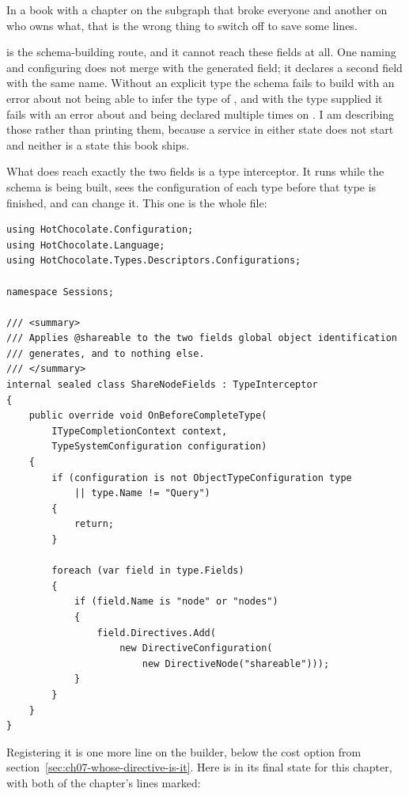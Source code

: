 %
In a book with a chapter on the subgraph that broke everyone and another on who
owns what, that is the wrong thing to switch off to save some lines.

%
 is the schema-building route, and it cannot reach
these fields at all. One naming  and configuring
 does not merge with the generated field; it declares a
second field with the same name. Without an explicit type the schema fails to
build with an error about not being able to infer the type of
, and with the type supplied it fails with an error about
 and  being declared multiple times on . I
am describing those rather than printing them, because a service in either
state does not start and neither is a state this book ships.

%
What does reach exactly the two fields is a type interceptor. It runs while the
schema is being built, sees the configuration of each type before that type is
finished, and can change it. This one is the whole file:

\begin{verbatim}
using HotChocolate.Configuration;
using HotChocolate.Language;
using HotChocolate.Types.Descriptors.Configurations;

namespace Sessions;

/// <summary>
/// Applies @shareable to the two fields global object identification
/// generates, and to nothing else.
/// </summary>
internal sealed class ShareNodeFields : TypeInterceptor
{
    public override void OnBeforeCompleteType(
        ITypeCompletionContext context,
        TypeSystemConfiguration configuration)
    {
        if (configuration is not ObjectTypeConfiguration type
            || type.Name != "Query")
        {
            return;
        }

        foreach (var field in type.Fields)
        {
            if (field.Name is "node" or "nodes")
            {
                field.Directives.Add(
                    new DirectiveConfiguration(
                        new DirectiveNode("shareable")));
            }
        }
    }
}
\end{verbatim}

%
Registering it is one more line on the builder, below the cost option from
section~\ref{sec:ch07-whose-directive-is-it}. Here is  in its
final state for this chapter, with both of the chapter's lines marked:

